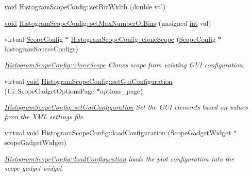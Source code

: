 \begin{DoxyCompactItemize}
\item 
\hyperlink{group___u_a_v_objects_plugin_ga444cf2ff3f0ecbe028adce838d373f5c}{void} \hyperlink{group___scope_plugin_ga692ce41b341567916c0ff62a541b4138}{Histogram\-Scope\-Config\-::set\-Bin\-Width} (\hyperlink{_super_l_u_support_8h_a8956b2b9f49bf918deed98379d159ca7}{double} val)
\item 
\hyperlink{group___u_a_v_objects_plugin_ga444cf2ff3f0ecbe028adce838d373f5c}{void} \hyperlink{group___scope_plugin_ga9fc3929f75679aa143e96e9919de54ac}{Histogram\-Scope\-Config\-::set\-Max\-Number\-Of\-Bins} (unsigned \hyperlink{ioapi_8h_a787fa3cf048117ba7123753c1e74fcd6}{int} val)
\item 
virtual \hyperlink{class_scope_config}{Scope\-Config} $\ast$ \hyperlink{group___scope_plugin_gaf687cd062ff03c3a6dcf3edb05d29662}{Histogram\-Scope\-Config\-::clone\-Scope} (\hyperlink{class_scope_config}{Scope\-Config} $\ast$histogram\-Source\-Configs)
\begin{DoxyCompactList}\small\item\em \hyperlink{group___scope_plugin_gaf687cd062ff03c3a6dcf3edb05d29662}{Histogram\-Scope\-Config\-::clone\-Scope} Clones scope from existing G\-U\-I configuration. \end{DoxyCompactList}\item 
virtual \hyperlink{group___u_a_v_objects_plugin_ga444cf2ff3f0ecbe028adce838d373f5c}{void} \hyperlink{group___scope_plugin_ga575b4cb9a8b9a9ad8e236487a3da570b}{Histogram\-Scope\-Config\-::set\-Gui\-Configuration} (Ui\-::\-Scope\-Gadget\-Options\-Page $\ast$options\-\_\-page)
\begin{DoxyCompactList}\small\item\em \hyperlink{group___scope_plugin_ga575b4cb9a8b9a9ad8e236487a3da570b}{Histogram\-Scope\-Config\-::set\-Gui\-Configuration} Set the G\-U\-I elements based on values from the X\-M\-L settings file. \end{DoxyCompactList}\item 
virtual \hyperlink{group___u_a_v_objects_plugin_ga444cf2ff3f0ecbe028adce838d373f5c}{void} \hyperlink{group___scope_plugin_gace592757ce86fefdc0848379d6833748}{Histogram\-Scope\-Config\-::load\-Configuration} (\hyperlink{class_scope_gadget_widget}{Scope\-Gadget\-Widget} $\ast$scope\-Gadget\-Widget)
\begin{DoxyCompactList}\small\item\em \hyperlink{group___scope_plugin_gace592757ce86fefdc0848379d6833748}{Histogram\-Scope\-Config\-::load\-Configuration} loads the plot configuration into the scope gadget widget. \end{DoxyCompactList}\item 

\end{DoxyCompactItemize}
